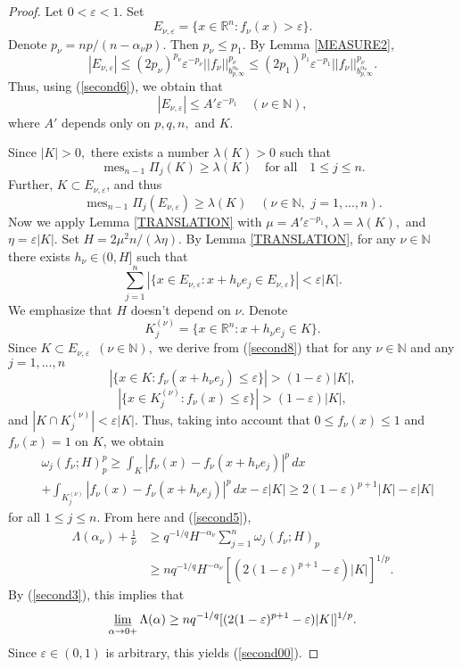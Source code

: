 \documentclass[12pt,twoside,reqno]{amsart}
\numberwithin{equation}{section}
\theoremstyle{definition}
\numberwithin{equation}{section}
\begin{document}
\begin{proof}
Let $0<{\varepsilon}<1.$ Set
$$
E_{\nu,{\varepsilon}}=\{x\in{\mathbb{R}}^n: f_\nu(x)>{\varepsilon}\}.
$$
Denote $p_\nu=np/(n-{\alpha}_\nu p)$. Then $p_\nu\le p_1.$ By Lemma
\ref{MEASURE2},
$$
|E_{\nu,{\varepsilon}}|\le (2p_\nu)^{p_\nu}{\varepsilon}^{-p_\nu}||f_\nu||_{b_{p,\infty}^{{\alpha}_\nu}}^{p_\nu}\le (2p_1)^{p_1}{\varepsilon}^{-p_1}||f_\nu||_{b_{p,\infty}^{{\alpha}_\nu}}^{p_\nu}.
$$
Thus, using (\ref{second6}), we obtain that
\begin{equation}\label{second7}
|E_{\nu,{\varepsilon}}|\le A'{\varepsilon}^{-p_1} \quad (\nu\in {\mathbb{N}}),
\end{equation}
where  $A'$ depends only on $p,q,n,$ and $K.$

Since $|K|>0,$ there exists a number ${\lambda }(K)>0$ such that
$$
{\operatorname{mes}}_{n-1}
\Pi_j (K)\ge {\lambda }(K)\quad\mbox{for all}\quad 1\le j\le n.
$$
 Further, $K\subset
E_{\nu,{\varepsilon}}$, and thus
$$
{\operatorname{mes}}_{n-1} \Pi_j (E_{\nu,{\varepsilon}})\ge {\lambda }(K)\quad (\nu\in{\mathbb{N}},\,\, j=1,...,n).
$$
 Now we apply Lemma
\ref{TRANSLATION} with $\mu=A'{\varepsilon}^{-p_1}$, ${\lambda }={\lambda }(K),$ and
$\eta={\varepsilon}|K|.$ Set $H=2\mu^2n/({\lambda }\eta)$. By Lemma \ref{TRANSLATION},
for any $\nu\in{\mathbb{N}}$ there exists $h_\nu\in
(0,H]$ such that
\begin{equation}\label{second8}
\sum_{j=1}^n|\{x\in E_{\nu,{\varepsilon}}:x+h_\nu e_j\in E_{\nu,{\varepsilon}}\}|<{\varepsilon} |K|.
\end{equation}
We emphasize that $H$ doesn't depend on $\nu.$ Denote
$$
K_j^{(\nu)}=\{x\in {\mathbb{R}}^n: x+h_\nu e_j\in K\}.
$$
Since $K\subset
E_{\nu,{\varepsilon}}\,\,\, (\nu\in {\mathbb{N}}),$ we derive from (\ref{second8}) that
for any $\nu\in {\mathbb{N}}$ and any $j=1,...,n$
$$
|\{x\in K: f_\nu(x+h_\nu e_j)\le {\varepsilon}\}|>(1-{\varepsilon})|K|,
$$
$$
  |\{x\in K_j^{(\nu)}: f_\nu(x)\le {\varepsilon}\}|>(1-{\varepsilon})|K|,
$$
 and $|K\cap
K_j^{(\nu)}|<{\varepsilon} |K|$. Thus, taking into account that $0\le
f_\nu(x)\le 1$ and $f_\nu(x)=1$ on $K$, we obtain
$$
\begin{aligned}
&{\omega}_j(f_\nu;H)_p^p\ge \int_K|f_\nu(x)-f_\nu(x+h_\nu e_j)|^p\,dx\\
 &+ \int_{K_j^{(\nu)}}|f_\nu(x)-f_\nu(x+h_\nu e_j)|^p\,dx -{\varepsilon}|K|
\ge 2(1-{\varepsilon})^{p+1}|K|-{\varepsilon}|K|
\end{aligned}
$$
for all $1\le j\le n.$ From here and (\ref{second5}),
$$
\begin{aligned}
\Lambda({\alpha}_\nu)+\frac1{\nu}&\ge q^{-1/q} H^{-{\alpha}_\nu}\sum_{j=1}^n{\omega}_j(f_\nu;H)_p\\
&\ge nq^{-1/q} H^{-{\alpha}_\nu}[(2(1-{\varepsilon})^{p+1}-{\varepsilon})|K|]^{1/p}.
\end{aligned}
$$
By (\ref{second3}), this implies that
$$
\varliminf_{{\alpha}\to 0+}\Lambda({\alpha})\ge nq^{-1/q}[(2(1-{\varepsilon})^{p+1}-{\varepsilon})|K|]^{1/p}.
$$
Since ${\varepsilon}\in (0,1)$ is arbitrary, this yields (\ref{second00}).


\end{proof}
\end{document}
